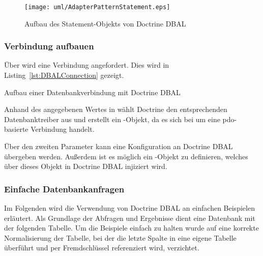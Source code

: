 \begin{figure}[H]
	\centering
	\texttt{[image: uml/AdapterPatternStatement.eps]}
	\caption{Aufbau des Statement-Objekts von Doctrine DBAL}
	\label{fig:adpaterPatternStatement}
\end{figure}

\subsubsection{Verbindung aufbauen}
\label{basics:doctrine:subsubsec:createConnection}
Über  wird eine Verbindung angefordert. Dies wird in Listing~\ref{lst:DBALConnection} gezeigt.

\begin{listing}[H]
\caption{Aufbau einer Datenbankverbindung mit Doctrine DBAL}
\label{lst:DBALConnection}
\end{listing}

Anhand des angegebenen Wertes in  wählt Doctrine den entsprechenden Datenbanktreiber aus und erstellt ein -Objekt, da es sich bei  um eine \gls{pdo}-basierte Verbindung handelt.

Über den zweiten Parameter  kann eine Konfiguration an Doctrine DBAL übergeben werden. Außerdem ist es möglich ein -Objekt zu definieren, welches über dieses Objekt in Doctrine DBAL injiziert wird.

\subsubsection{Einfache Datenbankanfragen}
\label{basics:doctrine:subsubsec:simpleDatabaseQueries}

Im Folgenden wird die Verwendung von Doctrine DBAL an einfachen Beispielen erläutert. Als Grundlage der Abfragen und Ergebnisse dient eine Datenbank mit der folgenden Tabelle. Um die Beispiele einfach zu halten wurde auf eine korrekte Normalisierung der Tabelle, bei der die letzte Spalte in eine eigene Tabelle überführt und per Fremdschlüssel referenziert wird, verzichtet.


